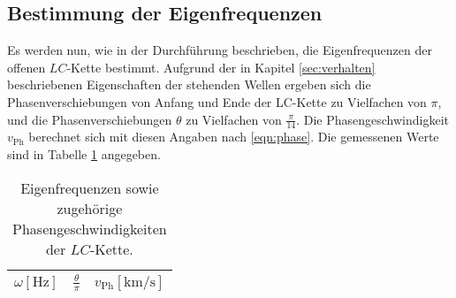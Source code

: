 \subsection{Bestimmung der Eigenfrequenzen}
Es werden nun, wie in der Durchführung beschrieben, die Eigenfrequenzen der offenen $LC$-Kette bestimmt.
Aufgrund der in Kapitel \ref{sec:verhalten} beschriebenen Eigenschaften der stehenden Wellen ergeben sich die Phasenverschiebungen von Anfang und Ende der LC-Kette zu Vielfachen von $\pi$, und die Phasenverschiebungen $\theta$ zu Vielfachen von $\frac{\pi}{14}$.
Die Phasengeschwindigkeit $v_{\text{Ph}}$ berechnet sich mit diesen Angaben nach \eqref{eqn:phase}.
Die gemessenen Werte sind in Tabelle \ref{tab:eigenfrequenzen} angegeben.
\begin{table}
  \centering
  \caption{Eigenfrequenzen sowie zugehörige Phasengeschwindigkeiten der $LC$-Kette.}
  \label{tab:eigenfrequenzen}
  \begin{tabular}{c c c}
    \toprule
    {$\omega [\si{\hertz}]$} & {$\frac{\theta}{\pi} $} & {$v_{\text{Ph}} [\si{\kilo\metre\per\second}] $}\\
    \midrule
    
    \bottomrule
  \end{tabular}
\end{table}
